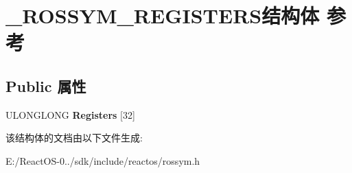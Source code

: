 \hypertarget{struct___r_o_s_s_y_m___r_e_g_i_s_t_e_r_s}{}\section{\+\_\+\+R\+O\+S\+S\+Y\+M\+\_\+\+R\+E\+G\+I\+S\+T\+E\+R\+S结构体 参考}
\label{struct___r_o_s_s_y_m___r_e_g_i_s_t_e_r_s}
\subsection*{Public 属性}
\begin{DoxyCompactItemize}
\item 
\mbox{\label{struct___r_o_s_s_y_m___r_e_g_i_s_t_e_r_s_a0bdb381f58a81662d7fb40d52b866829}} 
U\+L\+O\+N\+G\+L\+O\+NG {\bfseries Registers} \mbox{[}32\mbox{]}
\end{DoxyCompactItemize}


该结构体的文档由以下文件生成\+:\begin{DoxyCompactItemize}
\item 
E\+:/\+React\+O\+S-\/0../sdk/include/reactos/rossym.\+h\end{DoxyCompactItemize}
